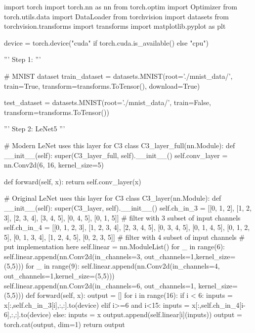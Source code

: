 \documentclass[10pt]{article}
\begin{document}
\begin{python}
import torch
import torch.nn as nn
from torch.optim import Optimizer
from torch.utils.data import DataLoader
from torchvision import datasets
from torchvision.transforms import transforms
import matplotlib.pyplot as plt 

device = torch.device("cuda" if torch.cuda.is_available() else "cpu")

'''
Step 1:
'''

# MNIST dataset
train_dataset = datasets.MNIST(root='./mnist_data/',
                               train=True, 
                               transform=transforms.ToTensor(),
                               download=True)

test_dataset = datasets.MNIST(root='./mnist_data/',
                              train=False, 
                              transform=transforms.ToTensor())


'''
Step 2: LeNet5
'''

# Modern LeNet uses this layer for C3
class C3_layer_full(nn.Module):
    def __init__(self):
        super(C3_layer_full, self).__init__()
        self.conv_layer = nn.Conv2d(6, 16, kernel_size=5)

    def forward(self, x):
        return self.conv_layer(x)

# Original LeNet uses this layer for C3
class C3_layer(nn.Module):
    def __init__(self):
        super(C3_layer, self).__init__()
        self.ch_in_3 = [[0, 1, 2],
                        [1, 2, 3],
                        [2, 3, 4],
                        [3, 4, 5],
                        [0, 4, 5],
                        [0, 1, 5]] # filter with 3 subset of input channels
        self.ch_in_4 = [[0, 1, 2, 3],
                        [1, 2, 3, 4],
                        [2, 3, 4, 5],
                        [0, 3, 4, 5],
                        [0, 1, 4, 5],
                        [0, 1, 2, 5],
                        [0, 1, 3, 4],
                        [1, 2, 4, 5],
                        [0, 2, 3, 5]] # filter with 4 subset of input channels
        # put implementation here
        self.linear = nn.ModuleList()
        for _ in range(6):
            self.linear.append(nn.Conv2d(in_channels=3, out_channels=1,kernel_size=(5,5)))
        for _ in range(9):
            self.linear.append(nn.Conv2d(in_channels=4, out_channels=1,kernel_size=(5,5)))
        self.linear.append(nn.Conv2d(in_channels=6, out_channels=1, kernel_size=(5,5)))
    def forward(self, x):
        output = []
        for i in range(16):
            if i < 6:
                inputs = x[:,self.ch_in_3[i],:,:].to(device)
            elif i>=6 and i<15:
                inputs = x[:,self.ch_in_4[i-6],:,:].to(device)
            else:
                inputs = x
            output.append(self.linear[i](inputs))
        output = torch.cat(output, dim=1)
        return output
    

\end{python}
\end{document}
